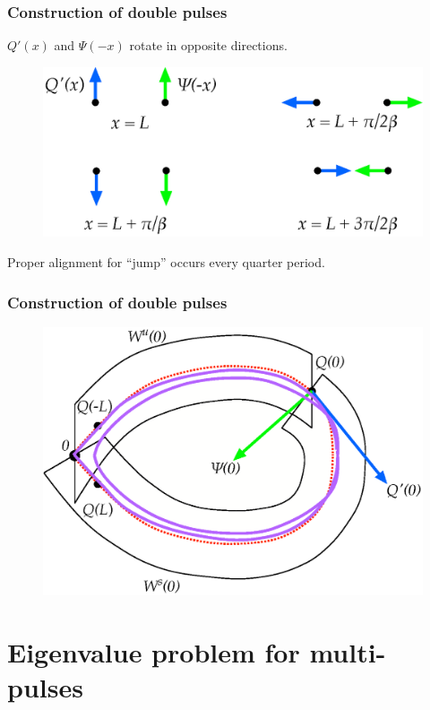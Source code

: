 \documentclass[16pt]{beamer}
\begin{document}
\begin{frame}
	\frametitle{Construction of double pulses}
	\fontsize{16}{7.2}\selectfont
	$Q'(x)$ and $\Psi(-x)$ rotate in opposite directions.
	\begin{figure}
	\begin{center}
	\includegraphics[width=0.6\linewidth]{images/psiqoneperiod} 
	\end{center}
	\end{figure}
	Proper alignment for ``jump'' occurs every quarter period.
\end{frame}

\begin{frame}
	\frametitle{Construction of double pulses}
	\fontsize{16}{7.2}\selectfont
	\begin{figure}
	\begin{center}
	\includegraphics[width=0.6\linewidth]{images/WsWudouble}
	\end{center}
	\end{figure}
\end{frame}

\section{Eigenvalue problem for multi-pulses}
\end{document}
